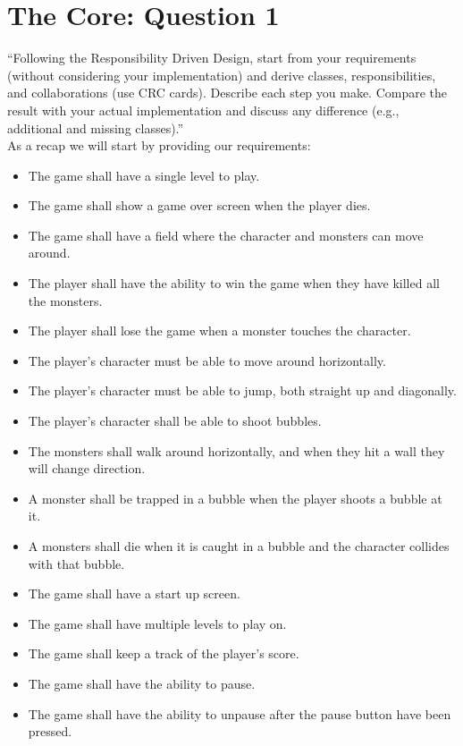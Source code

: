 \chapter{The Core: Question 1}

``Following the Responsibility Driven Design, start from your requirements (without considering your implementation) and derive classes, responsibilities, and collaborations (use CRC cards). Describe each step you make. Compare the result with your actual implementation and discuss any difference (e.g., additional and missing classes).'' \\

As a recap we will start by providing our requirements: \\
\begin{itemize}
  	\item The game shall have a single level to play.
  	\item The game shall show a game over screen when the player dies.
 	\item The game shall have a field where the character and monsters can move around.
  	\item The player shall have the ability to win the game when they have killed all the monsters.
 	\item The player shall lose the game when a monster touches the character.
  	\item The player's character must be able to move around horizontally.
  	\item The player's character must be able to jump, both straight up and diagonally.
  	\item The player's character shall be able to shoot bubbles.
  	\item The monsters shall walk around horizontally, and when they hit a wall they will change direction. 
 	\item A monster shall be trapped in a bubble when the player shoots a bubble at it.
 	\item A monsters shall die when it is caught in a bubble and the character collides with that bubble.
 	 \item The game shall have a start up screen.
	 \item The game shall have multiple levels to play on.
	 \item The game shall keep a track of the player's score.
	 \item The game shall have the ability to pause.
	 \item The game shall have the ability to unpause after the pause button have been pressed.

\end{itemize}
